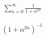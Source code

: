\exercicio{}

\begin{align*}
	\sum_{n=0}^{\infty} \frac{1}{1 + \alpha^{2n}}
\end{align*}

\begin{align*}
	(1 + \alpha^{2n})^{-1}
\end{align*}
